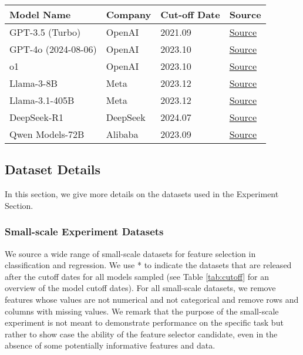 \begin{table*}[!ht]
\centering
\begin{tabular}{l l l l}
\toprule
\textbf{Model Name} & \textbf{Company} & \textbf{Cut-off Date} & \textbf{Source} \\
\midrule
GPT-3.5 (Turbo) & OpenAI & 2021.09 & \href{https://platform.openai.com/docs/models#gpt-3-5-turbo}{Source} \\
GPT-4o (2024-08-06) & OpenAI & 2023.10 & \href{https://platform.openai.com/docs/models\#gpt-4o}{Source} \\
o1 & OpenAI & 2023.10 & \href{https://platform.openai.com/docs/models\#o1}{Source} \\
Llama-3-8B & Meta & 2023.12 & \href{https://huggingface.co/meta-llama/Meta-Llama-3-8B-Instruct}{Source} \\
Llama-3.1-405B & Meta & 2023.12 & \href{https://huggingface.co/meta-llama/Llama-3.1-405B-Instruct}{Source} \\
DeepSeek-R1 & DeepSeek & 2024.07 & \href{https://www.deepseek.com/}{Source} \\
Qwen Models-72B & Alibaba & 2023.09 & \href{https://huggingface.co/Qwen/Qwen2-72B}{Source} \\
\bottomrule
\end{tabular}
\caption{Surveyed LLMs Cutoff Dates Overview}
\label{tab:cutoff}
\end{table*}

\subsection{Dataset Details}\label{subapp:dataset-details}
In this section, we give more details on the datasets used in the Experiment Section.
\subsubsection{Small-scale Experiment Datasets}\label{subsec:small_scale_data}
We source a wide range of small-scale datasets for feature selection in classification and regression. We use * to indicate the datasets that are released after the cutoff dates for all models sampled (see Table \ref{tab:cutoff} for an overview of the model cutoff dates). For all small-scale datasets, we remove features whose values are not numerical and not categorical and remove rows and columns with missing values. We remark that the purpose of the small-scale experiment is not meant to demonstrate performance on the specific task but rather to show case the ability of the feature selector candidate, even in the absence of some potentially informative features and data.


